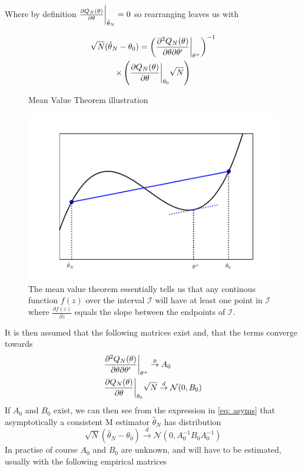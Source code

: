 Where by definition $\frac{\partial Q_N(\theta)}{\partial \theta} \bigg{|}_{\hat{\theta}_N} = 0$ so rearranging leaves us with


\begin{multline} \label{eq: asyms}
\sqrt{N}(\hat{\theta}_N - \theta_0) = \left( \frac{\partial^2 Q_N(\theta)}{\partial \theta \partial \theta'} \bigg{|}_{\theta^+} \right)^{-1}  \\ \times
\left(
\frac{\partial Q_N(\theta)}{\partial \theta} \bigg{|}_{\theta_0} \sqrt{N}
\right)
\end{multline}


\begin{figure}
\caption{Mean Value Theorem illustration}
\label{fig: MVT}
\includegraphics[width = \linewidth]{figures/mvt}
\caption*{The mean value theorem essentially tells us that any continous function $f(z)$ over the interval $\mathcal{I}$ will have at least one point in $\mathcal{I}$ where $\frac{\partial f(z)}{\partial z}$ equals the slope between the endpoints of $\mathcal{I}$.}
\end{figure}

It is then assumed that the following matrices exist and, that the terms converge towards
\begin{align*}
&\frac{\partial^2 Q_N(\theta)}{\partial \theta \partial \theta'} \bigg{|}_{\theta^+} \overset{p}{\rightarrow} A_0 \\
& \frac{\partial Q_N(\theta)}{\partial \theta} \bigg{|}_{\theta_0} \sqrt{N} \overset{d}{\rightarrow} \mathcal{N}(0,B_0)
\end{align*}
If $A_0$ and $B_0$ exist, we can then see from the expression in \eqref{eq: asyms} that asymptotically a consistent M estimator $\hat{\theta}_N$ has distribution
 \begin{equation}
 \sqrt{N}(\hat{\theta}_N - \theta_0) \overset{d}{\rightarrow} \mathcal{N}(0, A_0^{-1}B_0A_0^{-1})
 \end{equation}
In practise of course $A_0$ and $B_0$ are unknown, and will have to be estimated, usually with the following empirical matrices

